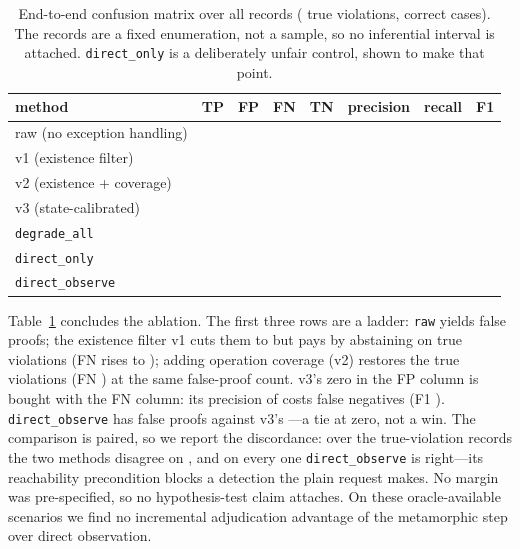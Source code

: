 \begin{table}[t]
\centering
\caption{End-to-end confusion matrix over all \ResSynRecords{} records
(\ResAbNBola{} true violations, \ResAbNNormal{} correct cases). The records are
a fixed enumeration, not a sample, so no inferential interval is attached.
\texttt{direct\_only} is a deliberately unfair control, shown to make that point.}
\label{tab:ablation}
\begin{tabular}{lrrrrrrl}
\toprule
method & TP & FP & FN & TN & precision & recall & F1 \\
\midrule
raw (no exception handling) & \ResAbRawTP{} & \ResAbRawFP{} & \ResAbRawFN{} & \ResAbRawTN{} & \ResAbRawPrec{} & \ResAbRawRec{} & \ResAbRawFone{} \\
v1 (existence filter) & \ResAbVOneTP{} & \ResAbVOneFP{} & \ResAbVOneFN{} & \ResAbVOneTN{} & \ResAbVOnePrec{} & \ResAbVOneRec{} & \ResAbVOneFone{} \\
v2 (existence + coverage) & \ResAbVTwoTP{} & \ResAbVTwoFP{} & \ResAbVTwoFN{} & \ResAbVTwoTN{} & \ResAbVTwoPrec{} & \ResAbVTwoRec{} & \ResAbVTwoFone{} \\
v3 (state-calibrated) & \ResAbVThreeTP{} & \ResAbVThreeFP{} & \ResAbVThreeFN{} & \ResAbVThreeTN{} & \ResAbVThreePrec{} & \ResAbVThreeRec{} & \ResAbVThreeFone{} \\
\texttt{degrade\_all} & \ResAbDegradeAllTP{} & \ResAbDegradeAllFP{} & \ResAbDegradeAllFN{} & \ResAbDegradeAllTN{} & \ResAbDegradeAllPrec{} & \ResAbDegradeAllRec{} & \ResAbDegradeAllFone{} \\
\texttt{direct\_only} & \ResAbDirectOnlyTP{} & \ResAbDirectOnlyFP{} & \ResAbDirectOnlyFN{} & \ResAbDirectOnlyTN{} & \ResAbDirectOnlyPrec{} & \ResAbDirectOnlyRec{} & \ResAbDirectOnlyFone{} \\
\texttt{direct\_observe} & \ResAbDirectObserveTP{} & \ResAbDirectObserveFP{} & \ResAbDirectObserveFN{} & \ResAbDirectObserveTN{} & \ResAbDirectObservePrec{} & \ResAbDirectObserveRec{} & \ResAbDirectObserveFone{} \\
\bottomrule
\end{tabular}
\end{table}

Table~\ref{tab:ablation} concludes the ablation. The first three rows are a ladder:
\texttt{raw} yields \ResAbRawFP{} false proofs; the existence filter v1 cuts them to
\ResAbVOneFP{} but pays by abstaining on true violations (FN rises to
\ResAbVOneFN{}); adding operation coverage (v2) restores the true violations (FN
\ResAbVTwoFN{}) at the same false-proof count. v3's zero in the FP column is bought with
the FN column: its precision of \ResAbVThreePrec{} costs \ResAbVThreeFN{} false negatives
(F1 \ResAbVThreeFone{}). \texttt{direct\_observe} has \ResAbDirectObserveFP{} false proofs
against v3's \ResAbVThreeFP{}---a tie at zero, not a win. The comparison is paired, so we
report the discordance: over the \ResAbNBola{} true-violation records the two methods
disagree on \ResAbDisagreementN{}, and on every one \texttt{direct\_observe} is
right---its reachability precondition blocks a detection the plain request makes. No
margin was pre-specified, so no hypothesis-test claim attaches. On these oracle-available
scenarios we find no incremental adjudication advantage of the metamorphic step over
direct observation.

